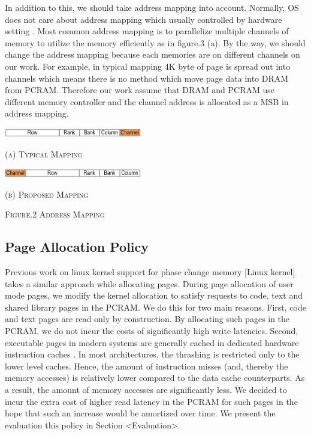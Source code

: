 \documentclass[a4paper, 11pt, conference]{ieeeconf}      %
\begin{document}
In addition to this, we should take address mapping into account.  Normally, OS does not care about address mapping which usually controlled by hardware setting \cite{kaseridis2011minimalist}.  Most common address mapping is to parallelize multiple channels of memory to utilize the memory efficiently as in figure.3 (a). By the way, we should change the address mapping because each memories are on different channels on our work. For example, in typical mapping 4K byte of page is spread out into channels which means there is no method which move page data into DRAM from PCRAM.  Therefore our work assume that DRAM and PCRAM use different memory controller and the channel address is allocated as a MSB in address mapping.

\vspace{3mm}
\includegraphics[width=0.45\textwidth]{Architecture/2-OldAddrMap.jpg}
\begin{center}
  {\textsc{(a) Typical Mapping}}
\end{center}

\vspace{3mm}
\includegraphics[width=0.45\textwidth]{Architecture/3-NewAddrMap.jpg}
\begin{center}
  {\textsc{(b) Proposed Mapping}}
\end{center}
\begin{center}
  {\textsc{Figure.2 Address Mapping}}
\end{center}

\subsection{Page Allocation Policy} \vspace{1mm}
Previous work on linux kernel support for phase change memory [Linux kernel] takes a similar approach while allocating pages. During page allocation of user mode pages, we modify the kernel allocation to satisfy requests to code, text and shared library pages in the PCRAM. We do this for two main reasons. First, code and text pages are read only by construction. By allocating such pages in the PCRAM, we do not incur the costs of significantly high write latencies. Second, executable pages in modern systems are generally cached in dedicated hardware instruction caches . In most architectures, the thrashing is restricted only to the lower level caches. Hence, the amount of instruction misses (and, thereby the memory accesses) is relatively lower compared to the data cache counterparts. As a result, the amount of memory accesses are significantly less. We decided to incur the extra cost of higher read latency in the PCRAM for such pages in the hope that such an increase would be amortized over time. We present the evaluation this policy in Section <Evaluation>.
\end{document}
